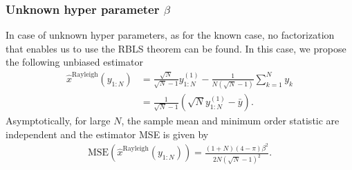\documentclass{article}
\newcommand{\MSE}{\mathrm{MSE}}
\begin{document}
\subsubsection{Unknown hyper parameter $\beta$}
 In case of unknown hyper parameters, as for the known case, no factorization that enables us to use the RBLS theorem can be found. In this case, we propose the following unbiased estimator
%
%
\begin{align}
\hat{x}^{\mathrm{Rayleigh}}(y_{1:N}) &= \frac{\sqrt{N}}{\sqrt{N}-1}y^{(1)}_{1:N} - \frac{1}{N(\sqrt{N}-1)}\sum_{k=1}^{N}y_k\nonumber\\&= \frac{1}{\sqrt N-1}(\sqrt{N}y^{(1)}_{1:N} - \bar{y}).
\end{align}
%
% 
Asymptotically, for large $N$, the sample mean and minimum order statistic are independent and the estimator MSE is given by
%
%
\begin{align}
\MSE\left(\hat{x}^{\mathrm{Rayleigh}}(y_{1:N})\right)=\frac{(1+N)(4-\pi)\beta^2}{2N(\sqrt{N}-1)^2}.
\label{eq:minimum_orde_unknown_rayleigh}
\end{align}
%
%
\end{document}
